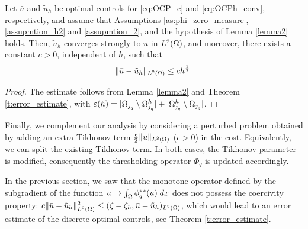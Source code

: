 {\begin{corollary}
    Let $\bar u$  and $\tilde u_h$ be optimal controls for \eqref{eq:OCP_c} and  \eqref{eq:OCPh_conv}, respectively, and assume that Assumptions \ref{as:phi_zero_measure}, \ref{assupmtion_h2} and \ref{assupmtion_2}, and the hypothesis of Lemma \ref{lemma2} holds. Then,  $\tilde u_h$ converges strongly to $\bar u$ in $L^2(\Omega)$, and moreover, there exists a constant $c>0$, independent of $h$, such that 
\begin{equation}\label{eq:error_u}
\lVert \bar u-\tilde u_h \rVert_{L^2(\Omega)}\le ch^{\frac12}.
\end{equation}
\end{corollary}

\begin{proof}
    The estimate follows from Lemma \ref{lemma2} and Theorem \ref{t:error_estimate}, with $\varepsilon(h) = |{\Omega_{\operatorname{\jmath}_q}}\setminus  {\Omega^h_{\operatorname{\jmath}_q}} | + |{\Omega^h_{\operatorname{\jmath}_q}}\setminus  {\Omega_{\operatorname{\jmath}_q}}  |$.
\end{proof}


Finally, we complement our analysis by considering a perturbed problem obtained by adding an extra Tikhonov term $\frac{\epsilon}{2} \|u\|_{L^2(\Omega)}$ ($\epsilon>0$) in the cost. Equivalently, we can split the existing Tikhonov term. In both cases, the Tikhonov parameter is modified, consequently the thresholding operator $\Phi_q$ is updated accordingly.

In the previous section, we saw  that the monotone operator defined by the subgradient of the function $u \mapsto \int_{\Omega}\phi_q^{**}(u)\; dx$ does not possess the coercivity property:  $c\|\bar u -\tilde u_h\|^2_{L^2(\Omega)} \leq (\zeta - \zeta_h , \bar u -\tilde u_h)_{L^2(\Omega)} $, which would lead to an error estimate of the discrete optimal controls, see Theorem \ref{t:error_estimate}. 

}
